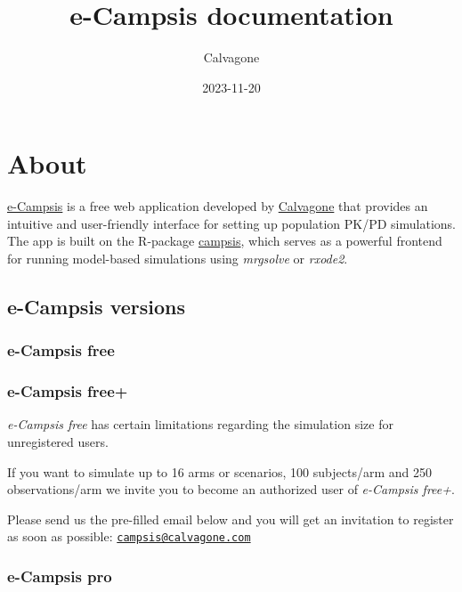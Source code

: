 \documentclass[
]{book}
\title{e-Campsis documentation}
\author{Calvagone}
\date{2023-11-20}
\theoremstyle{definition}
\theoremstyle{definition}
\theoremstyle{definition}
\theoremstyle{definition}
\theoremstyle{remark}
\begin{document}
\maketitle

{
\setcounter{tocdepth}{1}
\tableofcontents
}
\hypertarget{about}{%
\chapter{About}\label{about}}

\href{https://ecampsis.shinyapps.io/free/}{e-Campsis} is a free web application developed by \href{https://www.calvagone.com/}{Calvagone} that provides an intuitive and user-friendly interface for setting up population PK/PD simulations.
The app is built on the R-package \href{https://calvagone.github.io/}{campsis}, which serves as a powerful frontend for running model-based simulations using \emph{mrgsolve} or \emph{rxode2}.

\hypertarget{e-campsis-versions}{%
\section{e-Campsis versions}\label{e-campsis-versions}}

\hypertarget{e-campsis-free}{%
\subsection{e-Campsis free}\label{e-campsis-free}}

\hypertarget{e-campsis-free-1}{%
\subsection{e-Campsis free+}\label{e-campsis-free-1}}

\emph{e-Campsis free} has certain limitations regarding the simulation size for unregistered users.

If you want to simulate up to 16 arms or scenarios, 100 subjects/arm and 250 observations/arm we invite you to become an authorized user of \emph{e-Campsis free+}.

Please send us the pre-filled email below and you will get an invitation to register as soon as possible: \href{mailto:campsis@calvagone.com}{\nolinkurl{campsis@calvagone.com}}

\hypertarget{e-campsis-pro}{%
\subsection{e-Campsis pro}\label{e-campsis-pro}}
\end{document}
